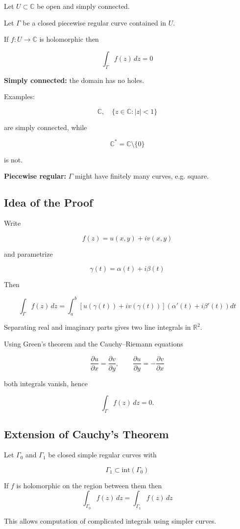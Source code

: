\begin{theorem}
Let $U \subset \mathbb{C}$ be open and simply connected.

Let $\Gamma$ be a closed piecewise regular curve contained in $U$.

If $f : U \to \mathbb{C}$ is holomorphic then

\[
\int_\Gamma f(z)\,dz = 0
\]
\end{theorem}

\textbf{Simply connected:} the domain has no holes.

Examples:

\[
\mathbb{C}, \quad \{z \in \mathbb{C} : |z| < 1\}
\]

are simply connected, while

\[
\mathbb{C}^* = \mathbb{C}\setminus\{0\}
\]

is not.

\textbf{Piecewise regular:} $\Gamma$ might have finitely many curves, e.g. square. 
\subsection{Idea of the Proof}

Write

\[
f(z) = u(x,y) + i v(x,y)
\]

and parametrize

\[
\gamma(t) = \alpha(t) + i\beta(t)
\]

Then

\[
\int_\Gamma f(z)\,dz
=
\int_a^b
\left[u(\gamma(t))+iv(\gamma(t))\right]
(\alpha'(t)+i\beta'(t))dt
\]

Separating real and imaginary parts gives two line integrals in $\mathbb{R}^2$.

Using Green's theorem and the Cauchy--Riemann equations

\[
\frac{\partial u}{\partial x} = \frac{\partial v}{\partial y},
\qquad
\frac{\partial u}{\partial y} = -\frac{\partial v}{\partial x}
\]

both integrals vanish, hence

\[
\int_\Gamma f(z)\,dz = 0.
\]

\subsection{Extension of Cauchy's Theorem}

\begin{corollary}
Let $\Gamma_0$ and $\Gamma_1$ be closed simple regular curves with

\[
\Gamma_1 \subset \text{int}(\Gamma_0)
\]

If $f$ is holomorphic on the region between them then
  \[
\int_{\Gamma_0} f(z)\,dz
=
\int_{\Gamma_1} f(z)\,dz
\]


\end{corollary}
This allows computation of complicated integrals using simpler curves.

